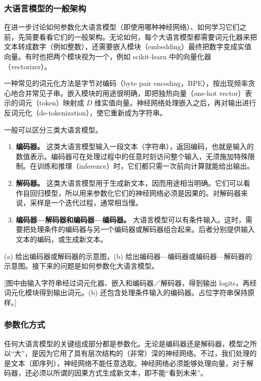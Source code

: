 \subsubsection{大语言模型的一般架构}
在进一步讨论如何参数化大语言模型（即使用哪种神经网络）、如何学习它们之前，先简要看看它们的一般架构。无论如何，每个大语言模型都需要词元化器来把文本转成数字（例如整数），还需要嵌入模块（embedding）最终把数字变成实值向量。有时也把两个模块视为一个，例如 scikit-learn 中的向量化器（vectorizer）。

一种常见的词元化方法是字节对编码（byte pair encoding，BPE），按出现频率贪心地合并常见子串。嵌入模块的用途很明确，即把独热向量（one-hot vector）表示的词元（token）映射成 $D$ 维实值向量。神经网络处理嵌入之后，再对输出进行反词元化（de-tokenization），使它重新成为字符串。

一般可以区分三类大语言模型。
\begin{enumerate}
\item \textbf{编码器。} 这类大语言模型输入一段文本（字符串），返回编码，也就是输入的数值表示。编码器可在处理过程中的任意时刻访问整个输入，无须施加特殊限制。在训练和推理（inference）时，它们都只需一次前向计算就能给出输出。
\item \textbf{解码器。} 这类大语言模型用于生成新文本，因而用途相当明确。它们可以看作自回归模型，所以用来参数化它们的神经网络必须是因果的。对解码器来说，采样是一个迭代过程，通常相当慢。
\item \textbf{编码器—解码器和编码器—编码器。} 大语言模型可以有条件输入。这时，需要把处理条件的编码器与另一个编码器或解码器组合起来。后者分别提供输入文本的编码，或生成新文本。
\end{enumerate}
(a) 给出编码器或解码器的示意图，(b) 给出编码器—编码器或编码器—解码器的示意图。接下来的问题是如何参数化大语言模型。

[图中由输入字符串经过词元化器、嵌入和编码器／解码器，得到输出 logits，再经词元化模块得到输出词元。(b) 还包含处理条件输入的编码器。占位字符串保持原样。]

\subsubsection{参数化方式}
任何大语言模型的关键组成部分都是参数化。无论是编码器还是解码器，模型之所以“大”，是因为它用了具有层次结构的（非常）深的神经网络。不过，我们处理的是文本（即序列），神经网络不能任意选取。神经网络必须能够处理向量，对于解码器，还必须以所谓的因果方式生成新文本，即不能“看到未来”。

